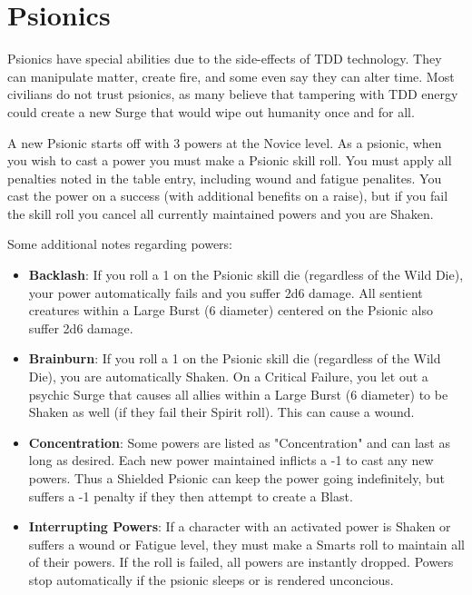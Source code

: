 
\section{Psionics}

\begin{multicols}{2}

Psionics have special abilities due to the side-effects of TDD technology. They can manipulate matter, create fire, and some even say they can alter time. Most civilians do not trust psionics, as many believe that tampering with TDD energy could create a new Surge that would wipe out humanity once and for all.

A new Psionic starts off with 3 powers at the Novice level. As a psionic, when you wish to cast a power you must make a Psionic skill roll. You must apply all penalties noted in the table entry, including wound and fatigue penalites. You cast the power on a success (with additional benefits on a raise), but if you fail the skill roll you cancel all currently maintained powers and you are Shaken.

Some additional notes regarding powers:

\begin{itemize}

  \item \textbf{Backlash}: If you roll a 1 on the Psionic skill die (regardless of the Wild Die), your power automatically fails and you suffer 2d6 damage. All sentient creatures within a Large Burst (6 diameter) centered on the Psionic also suffer 2d6 damage.

  \item \textbf{Brainburn}: If you roll a 1 on the Psionic skill die (regardless of the Wild Die), you are automatically Shaken. On a Critical Failure, you let out a psychic Surge that causes all allies within a Large Burst (6 diameter) to be Shaken as well (if they fail their Spirit roll). This can cause a wound.

  \item \textbf{Concentration}: Some powers are listed as "Concentration" and can last as long as desired. Each new power maintained inflicts a -1 to cast any new powers. Thus a Shielded Psionic can keep the power going indefinitely, but suffers a -1 penalty if they then attempt to create a Blast.

  \item \textbf{Interrupting Powers}: If a character with an activated power is Shaken or suffers a wound or Fatigue level, they must make a Smarts roll to maintain all of their powers. If the roll is failed, all powers are instantly dropped. Powers stop automatically if the psionic sleeps or is rendered unconcious.


\end{itemize}
\end{multicols}
